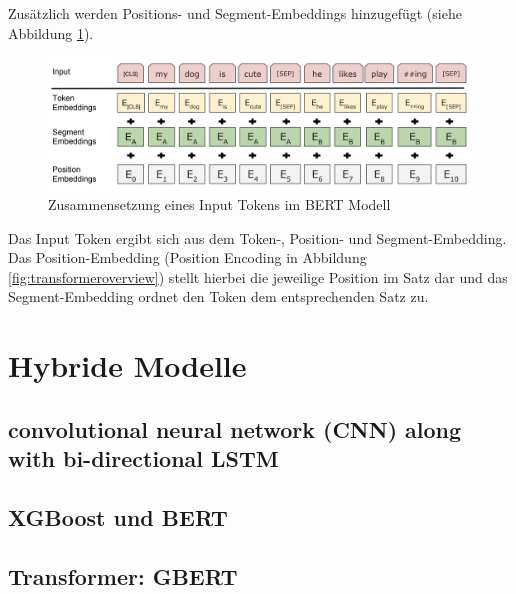 Zusätzlich werden Positions- und Segment-Embeddings hinzugefügt (siehe Abbildung \ref{fig:bert_tokenizierung}).

\begin{figure}[htbp]
    \begin{center}
        \includegraphics[scale=0.4]{static/bert_tokenizierung.png}
        \caption{\label{fig:bert_tokenizierung} Zusammensetzung eines Input Tokens im BERT Modell \cite{devlin2019}}
    \end{center}
\end{figure}

Das Input Token ergibt sich aus dem Token-, Position- und Segment-Embedding. Das Position-Embedding (Position Encoding in Abbildung \ref{fig:transformeroverview}) 
stellt hierbei die jeweilige Position im Satz dar und das Segment-Embedding ordnet den Token dem entsprechenden Satz zu.

\section{Hybride Modelle}
\label{sec:hybride_modelle}

\subsection{convolutional neural network (CNN) along with bi-directional LSTM}

\cite{umer2020}

\subsection{XGBoost und BERT}



\cite{sharma2025}

\cite{Buddhadev2025}

\subsection{Transformer: GBERT}

\cite{Dhiman:2024aa}

